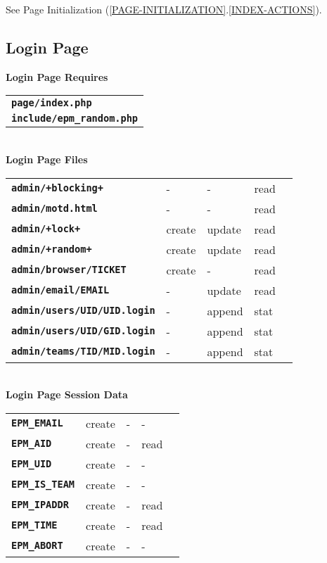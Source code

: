 \documentclass[12pt]{article}
\newcommand{\TT}[1]{{\tt \bfseries #1}}
\newcommand{\sref}[2]{(\ref{#1}.\ref{#2})}
\begin{document}
See Page Initialization \sref{PAGE-INITIALIZATION}{INDEX-ACTIONS}.

\newpage

\subsection{Login Page}

\begin{center}
{\bf Login Page Requires}
\\[1ex]
\begin{tabular}{l}
\TT{page/index.php} \\
\TT{include/epm\_random.php} \\
\end{tabular}
\\[3ex]
{\bf Login Page Files}
\\[1ex]
\begin{tabular}{lllll}
\TT{admin/+blocking+}		& -	  & -      & read \\
\TT{admin/motd.html}		& -	  & -      & read \\
\TT{admin/+lock+}		& create  & update & read \\
\TT{admin/+random+}		& create  & update & read
\\[2ex]
\TT{admin/browser/TICKET}	& create  & -      & read \\
\TT{admin/email/EMAIL}		& -       & update & read \\
\TT{admin/users/UID/UID.login}	& -       & append & stat \\
\TT{admin/users/UID/GID.login}	& -       & append & stat \\
\TT{admin/teams/TID/MID.login}	& -       & append & stat \\
\end{tabular}
\\[3ex]
{\bf Login Page Session Data}
\\[1ex]
\begin{tabular}{lllll}
\TT{EPM\_EMAIL}	& create  & -      & - \\
\TT{EPM\_AID}	& create  & -      & read    \\
\TT{EPM\_UID}	& create  & -      & -    \\
\TT{EPM\_IS\_TEAM}
		& create  & -      & -    \\
\TT{EPM\_IPADDR}& create  & -      & read \\
\TT{EPM\_TIME}
                & create  & -      & read \\
\TT{EPM\_ABORT}
                & create  & -      & - \\
\end{tabular}
\end{center}
\end{document}
